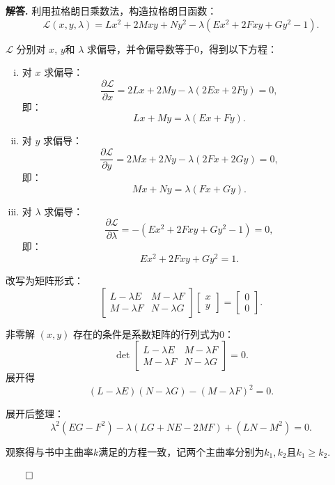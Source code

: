 \documentclass[12pt, a4paper, oneside]{ctexart}
\newenvironment{solution}{\par\noindent\textbf{解答. }}{\hfill$\qed$\par}
\begin{document}
	\begin{solution}
		利用拉格朗日乘数法，构造拉格朗日函数：
		\[
		\mathcal{L}(x, y, \lambda) = Lx^2 + 2Mxy + Ny^2 - \lambda (Ex^2 + 2Fxy + Gy^2 - 1).
		\]
		
		$\mathcal{L}$ 分别对 $x$, $y$和 $\lambda$ 求偏导，并令偏导数等于$0$，得到以下方程：
		\begin{enumerate}[(i)]
			\item 对 $x$ 求偏导：
			\[
			\frac{\partial \mathcal{L}}{\partial x} = 2Lx + 2My - \lambda (2Ex + 2Fy) = 0,
			\]
			即：
			\[
			Lx + My = \lambda (Ex + Fy).
			\]
			
			\item  对 $y$ 求偏导：
			\[
			\frac{\partial \mathcal{L}}{\partial y} = 2Mx + 2Ny - \lambda (2Fx + 2Gy) = 0,
			\]
			即：
			\[
			Mx + Ny = \lambda (Fx + Gy).
			\]
			
			\item  对 $\lambda$ 求偏导：
			\[
			\frac{\partial \mathcal{L}}{\partial \lambda} = -(Ex^2 + 2Fxy + Gy^2 - 1) = 0,
			\]
			即：
			\[
			Ex^2 + 2Fxy + Gy^2 = 1.
			\]
		\end{enumerate}
		

		改写为矩阵形式：
		\[
		\begin{bmatrix}
			L - \lambda E & M - \lambda F \\
			M - \lambda F & N - \lambda G
		\end{bmatrix}
		\begin{bmatrix}
			x \\
			y
		\end{bmatrix}
		= \begin{bmatrix}
			0 \\
			0
		\end{bmatrix}.
		\]
		
		非零解 $(x, y)$ 存在的条件是系数矩阵的行列式为$0$：
		\[
		\det\begin{bmatrix}
			L - \lambda E & M - \lambda F \\
			M - \lambda F & N - \lambda G
		\end{bmatrix} = 0.
		\]
		展开得
		\[
		(L - \lambda E)(N - \lambda G) - (M - \lambda F)^2 = 0.
		\]
		
		展开后整理：
		\[
		\lambda^2 (EG - F^2) - \lambda (LG + NE - 2MF) + (LN - M^2) = 0. \tag{4}
		\]
		
		观察得与书中主曲率$k$满足的方程一致，记两个主曲率分别为$k_{1},k_{2}$且$k_{1}\geq k_{2}$.
		

\end{solution}
\end{document}
